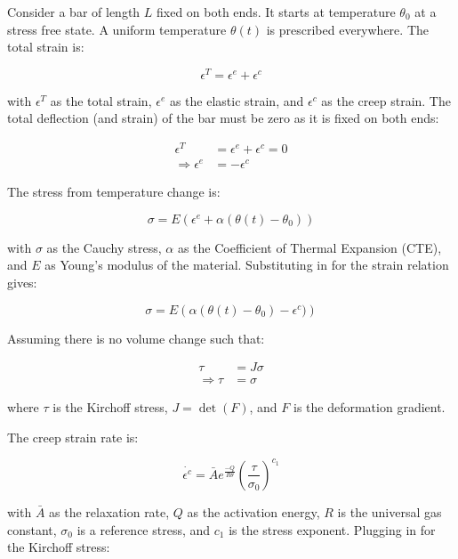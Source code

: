 \documentclass[conf]{new-aiaa}
\begin{document}
Consider a bar of length $L$ fixed on both ends.
It starts at temperature $\theta_0$ at a stress free state. 
A uniform temperature $\theta(t)$ is prescribed everywhere.
The total strain is:

\begin{equation}
\epsilon^T = \epsilon^e + \epsilon^c
\end{equation}

\noindent
with $\epsilon^T$ as the total strain,
$\epsilon^e$ as the elastic strain,
and
$\epsilon^c$ as the creep strain.
The total deflection (and strain) of the bar must be zero as it 
is fixed on both ends:

\begin{align}
\epsilon^T &= \epsilon^e + \epsilon^c = 0 \\
\Rightarrow
  \epsilon^e &= -\epsilon^c 
\end{align}

The stress from temperature change is:

\begin{equation}
\sigma = E \left( \epsilon^e + \alpha (\theta(t) - \theta_0) \right)
\end{equation}

\noindent
with $\sigma$ as the Cauchy stress, 
$\alpha$ as the Coefficient of Thermal Expansion (CTE),
and 
$E$ as Young's modulus of the material.
Substituting in for the strain relation gives:

\begin{equation}
\sigma = E \left( \alpha (\theta(t) - \theta_0) - \epsilon^c) \right) 
\end{equation}

Assuming there is no volume change such that:

\begin{align}
\tau &= J \sigma \\
\Rightarrow
  \tau &= \sigma
\end{align}

\noindent
where $\tau$ is the Kirchoff stress,
$J=\det(F)$,
and $F$ is the deformation gradient.

The creep strain rate is:

\begin{equation}
\dot{\epsilon^c} = \bar{A} e^{\frac{-Q}{R \theta}} \left( \frac{\tau}{\sigma_0} \right)^{c_1}
\end{equation}

\noindent
with $\bar{A}$ as the relaxation rate,
$Q$ as the activation energy,
$R$ is the universal gas constant,
$\sigma_0$ is a reference stress,
and
$c_1$ is the stress exponent.
Plugging in for the Kirchoff stress:
\end{document}
